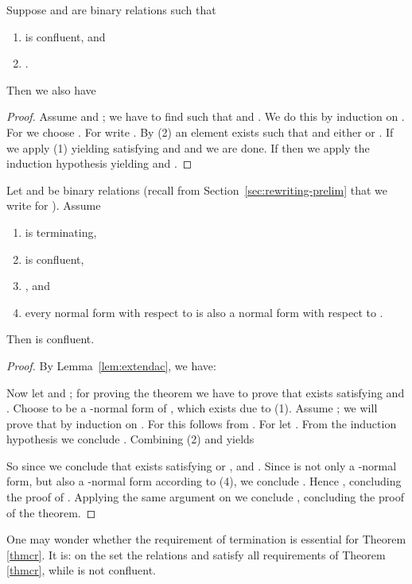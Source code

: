 \documentclass{LMCS}
\begin{document}
\begin{lem}
\label{lem:extendac}
Suppose  and  are binary relations such that
\begin{enumerate}[\em(1)]
\item  is confluent, and
\item .
\end{enumerate}
Then we also have

\end{lem}
\begin{proof}
Assume  and ; we have to find  such that  and . We do this by induction on
. For  we choose . For  write . By (2) an element  exists such that 
and either  or . If  we apply
(1) yielding  satisfying  and  and we
are done. If  then we apply the induction hypothesis
yielding  and .
\end{proof}

\begin{thm}
\label{thmcr}
Let  and  be binary relations (recall from
Section~\ref{sec:rewriting-prelim} that we write  for ). Assume
\begin{enumerate}[\em(1)]
\item  is terminating,
\item  is confluent,
\item , and
\item every normal form with respect to 
is also a normal form with respect to .
\end{enumerate}
Then   is confluent.
\end{thm}

\begin{proof} 
By Lemma~\ref{lem:extendac}, we have:

\noindent Now let  and ; for proving
the theorem we have to prove that  exists satisfying  and . Choose  to be a -normal form of
, which exists due to (1).  Assume ; we will prove
that  by induction on . For  this follows from
. For  let . From
the induction hypothesis we conclude .  Combining (2)
and  yields

So since  we conclude that  exists
satisfying  or , and . Since  is not only a
-normal form, but also a -normal form according to (4), 
we conclude . Hence ,
concluding the  proof of . Applying the same argument on
 we conclude , concluding the proof of the
theorem. 
\end{proof}

\vspace{3mm}

One may wonder whether the requirement of
termination is essential for Theorem \ref{thmcr}. It is: on the set  the
relations  and  satisfy
all requirements of Theorem \ref{thmcr}, while  is not confluent. 
\end{document}

